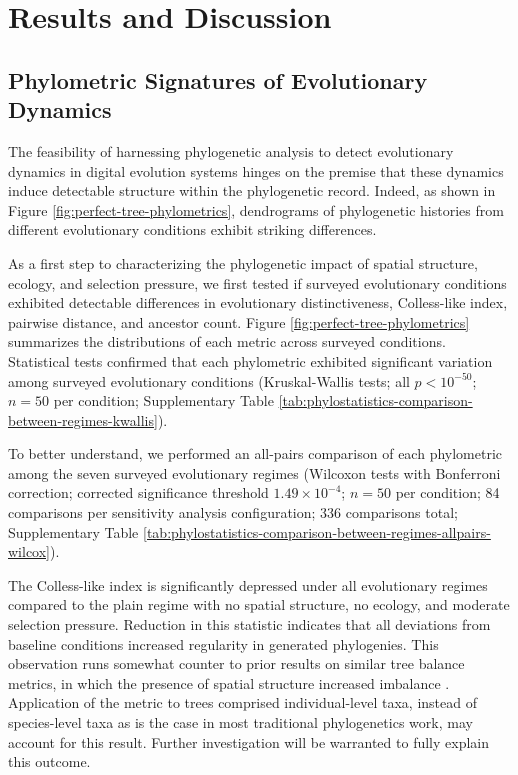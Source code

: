 \section{Results and Discussion}
\label{sec:results}

\subsection{Phylometric Signatures of Evolutionary Dynamics}




The feasibility of harnessing phylogenetic analysis to detect evolutionary dynamics in digital evolution systems hinges on the premise that these dynamics induce detectable structure within the phylogenetic record.
Indeed, as shown in Figure \ref{fig:perfect-tree-phylometrics}, dendrograms of phylogenetic histories from different evolutionary conditions exhibit striking differences.

As a first step to characterizing the phylogenetic impact of spatial structure, ecology, and selection pressure, we first tested if surveyed evolutionary conditions exhibited detectable differences in evolutionary distinctiveness, Colless-like index, pairwise distance, and ancestor count.
Figure \ref{fig:perfect-tree-phylometrics} summarizes the distributions of each metric across surveyed conditions.
Statistical tests confirmed that each phylometric exhibited significant variation among surveyed evolutionary conditions (Kruskal-Wallis tests; all $p < 10^{-50}$; $n=50$ per condition; Supplementary Table \ref{tab:phylostatistics-comparison-between-regimes-kwallis}).

To better understand, we performed an all-pairs comparison of each phylometric among the seven surveyed evolutionary regimes (Wilcoxon tests with Bonferroni correction; corrected significance threshold $1.49 \times 10^{-4}$; $n=50$ per condition; 84 comparisons per sensitivity analysis configuration; 336 comparisons total; Supplementary Table \ref{tab:phylostatistics-comparison-between-regimes-allpairs-wilcox}).

The Colless-like index is significantly depressed under all evolutionary regimes compared to the plain regime with no spatial structure, no ecology, and moderate selection pressure.
Reduction in this statistic indicates that all deviations from baseline conditions increased regularity in generated phylogenies.
This observation runs somewhat counter to prior results on similar tree balance metrics, in which the presence of spatial structure increased imbalance \citep{scottInferringTumorProliferative2020}.
Application of the metric to trees comprised individual-level taxa, instead of species-level taxa as is the case in most traditional phylogenetics work, may account for this result.
Further investigation will be warranted to fully explain this outcome.

